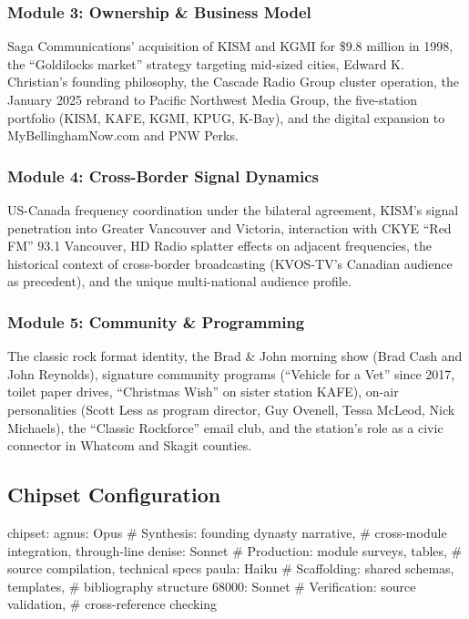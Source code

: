 \documentclass[11pt,letterpaper]{article}
\begin{document}
\subsubsection{Module 3: Ownership \& Business Model}

Saga Communications' acquisition of KISM and KGMI for \$9.8 million in 1998, the ``Goldilocks market'' strategy targeting mid-sized cities, Edward K. Christian's founding philosophy, the Cascade Radio Group cluster operation, the January 2025 rebrand to Pacific Northwest Media Group, the five-station portfolio (KISM, KAFE, KGMI, KPUG, K-Bay), and the digital expansion to MyBellinghamNow.com and PNW Perks.

\subsubsection{Module 4: Cross-Border Signal Dynamics}

US-Canada frequency coordination under the bilateral agreement, KISM's signal penetration into Greater Vancouver and Victoria, interaction with CKYE ``Red FM'' 93.1 Vancouver, HD Radio splatter effects on adjacent frequencies, the historical context of cross-border broadcasting (KVOS-TV's Canadian audience as precedent), and the unique multi-national audience profile.

\subsubsection{Module 5: Community \& Programming}

The classic rock format identity, the Brad \& John morning show (Brad Cash and John Reynolds), signature community programs (``Vehicle for a Vet'' since 2017, toilet paper drives, ``Christmas Wish'' on sister station KAFE), on-air personalities (Scott Less as program director, Guy Ovenell, Tessa McLeod, Nick Michaels), the ``Classic Rockforce'' email club, and the station's role as a civic connector in Whatcom and Skagit counties.

\subsection{Chipset Configuration}

\begin{asciibox}
chipset:
  agnus:   Opus    # Synthesis: founding dynasty narrative,
                   #   cross-module integration, through-line
  denise:  Sonnet  # Production: module surveys, tables,
                   #   source compilation, technical specs
  paula:   Haiku   # Scaffolding: shared schemas, templates,
                   #   bibliography structure
  68000:   Sonnet  # Verification: source validation,
                   #   cross-reference checking
\end{asciibox}
\end{document}
